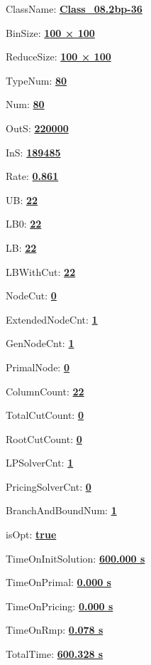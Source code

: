 \documentclass[11pt]{article}
\begin{document}
\pagestyle{empty}


ClassName: \underline{\textbf{Class_08.2bp-36}}
\par
BinSize: \underline{\textbf{100 × 100}}
\par
ReduceSize: \underline{\textbf{100 × 100}}
\par
TypeNum: \underline{\textbf{80}}
\par
Num: \underline{\textbf{80}}
\par
OutS: \underline{\textbf{220000}}
\par
InS: \underline{\textbf{189485}}
\par
Rate: \underline{\textbf{0.861}}
\par
UB: \underline{\textbf{22}}
\par
LB0: \underline{\textbf{22}}
\par
LB: \underline{\textbf{22}}
\par
LBWithCut: \underline{\textbf{22}}
\par
NodeCut: \underline{\textbf{0}}
\par
ExtendedNodeCnt: \underline{\textbf{1}}
\par
GenNodeCnt: \underline{\textbf{1}}
\par
PrimalNode: \underline{\textbf{0}}
\par
ColumnCount: \underline{\textbf{22}}
\par
TotalCutCount: \underline{\textbf{0}}
\par
RootCutCount: \underline{\textbf{0}}
\par
LPSolverCnt: \underline{\textbf{1}}
\par
PricingSolverCnt: \underline{\textbf{0}}
\par
BranchAndBoundNum: \underline{\textbf{1}}
\par
isOpt: \underline{\textbf{true}}
\par
TimeOnInitSolution: \underline{\textbf{600.000 s}}
\par
TimeOnPrimal: \underline{\textbf{0.000 s}}
\par
TimeOnPricing: \underline{\textbf{0.000 s}}
\par
TimeOnRmp: \underline{\textbf{0.078 s}}
\par
TotalTime: \underline{\textbf{600.328 s}}
\par
\newpage


\end{document}
